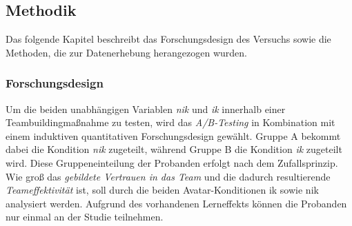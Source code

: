 \documentclass[a4paper,11pt]{article}%
\renewcommand{\\}{\vspace*{0.5\baselineskip} \newline}
\begin{document}
\subsection{Methodik}	
Das folgende Kapitel beschreibt das Forschungsdesign des Versuchs sowie die Methoden, die zur Datenerhebung herangezogen wurden.
\subsubsection{Forschungsdesign}

Um die beiden unabhängigen Variablen \textit{\ac{nik}} und \textit{\ac{ik}} innerhalb einer Teambuildingmaßnahme zu testen, wird das \textit{A/B-Testing} in Kombination mit einem induktiven quantitativen Forschungsdesign gewählt.
Gruppe A bekommt dabei die Kondition \newline \textit{\ac{nik}} zugeteilt, während Gruppe B die Kondition \textit{\ac{ik}} zugeteilt wird. Diese Gruppeneinteilung der Probanden erfolgt nach dem Zufallsprinzip. 
Wie groß das \textit{gebildete Vertrauen in das Team} und die dadurch resultierende \textit{Teameffektivität} ist, soll durch die beiden Avatar-Konditionen \ac{ik} sowie \ac{nik} analysiert werden. Aufgrund des vorhandenen Lerneffekts können die Probanden nur einmal an der Studie teilnehmen.

\end{document}
